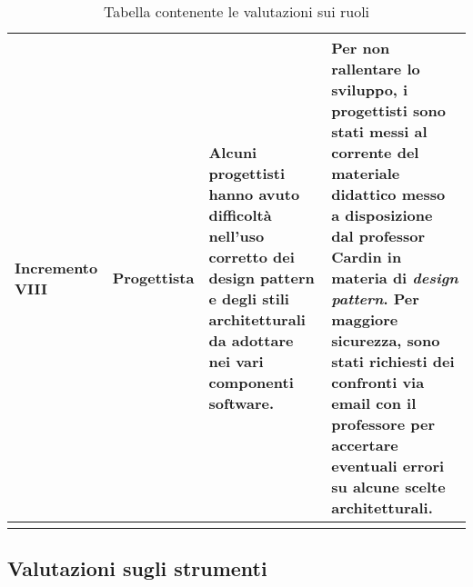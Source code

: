 \begin{center}
\begin{longtable}{|p{2.5cm}|p{2.5cm}|p{5cm}|p{5cm}|}
				Incremento VIII
				&
				Progettista
				&
				Alcuni progettisti hanno avuto difficoltà nell'uso corretto dei design pattern e degli stili architetturali da adottare nei vari componenti software.
				&
				Per non rallentare lo sviluppo, i progettisti sono stati messi al corrente del materiale didattico messo a disposizione dal professor Cardin in materia di \textit{design pattern}. Per maggiore sicurezza, sono stati richiesti dei confronti via email con il professore per accertare eventuali errori su alcune scelte architetturali. \\	
				\hline
				
				\caption{Tabella contenente le valutazioni sui ruoli}
			\end{longtable}
		\end{center}
	
	\newpage
	
	\subsection{Valutazioni sugli strumenti}

